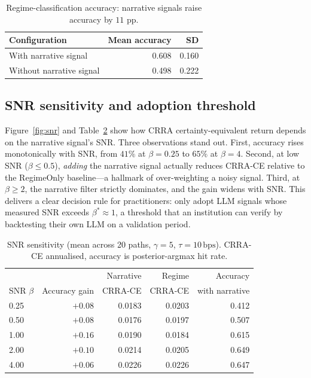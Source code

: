 \documentclass[review,12pt,authoryear]{elsarticle}
\begin{document}
\begin{table}[t]
\centering
\caption{Regime-classification accuracy: narrative signals raise accuracy by $11$ pp.}
\label{tab:acc}
\small
\begin{tabular}{lrr}
\toprule
Configuration & Mean accuracy & SD \\
\midrule
With narrative signal & 0.608 & 0.160 \\
Without narrative signal & 0.498 & 0.222 \\
\bottomrule
\end{tabular}
\end{table}

\subsection{SNR sensitivity and adoption threshold}
Figure~\ref{fig:snr} and Table~\ref{tab:snr} show how CRRA certainty-equivalent return
depends on the narrative signal's SNR. Three observations stand out. First, accuracy
rises monotonically with SNR, from $41\%$ at $\beta=0.25$ to $65\%$ at $\beta=4$. Second,
at low SNR ($\beta \le 0.5$), \emph{adding} the narrative signal actually reduces
CRRA-CE relative to the RegimeOnly baseline---a hallmark of over-weighting a noisy
signal. Third, at $\beta \ge 2$, the narrative filter strictly dominates, and the gain
widens with SNR. This delivers a clear decision rule for practitioners: only adopt LLM
signals whose measured SNR exceeds $\beta^{\ast} \approx 1$, a threshold that an
institution can verify by backtesting their own LLM on a validation period.

\begin{table}[t]
\centering
\caption{SNR sensitivity (mean across 20 paths, $\gamma=5$, $\tau=10\,\mathrm{bps}$).
CRRA-CE annualised, accuracy is posterior-argmax hit rate.}
\label{tab:snr}
\small
\begin{tabular}{lrrrr}
\toprule
 & & Narrative & Regime & Accuracy \\
SNR $\beta$ & Accuracy gain & CRRA-CE & CRRA-CE & with narrative \\
\midrule
0.25 & $+0.08$ & 0.0183 & 0.0203 & 0.412 \\
0.50 & $+0.08$ & 0.0176 & 0.0197 & 0.507 \\
1.00 & $+0.16$ & 0.0190 & 0.0184 & 0.615 \\
2.00 & $+0.10$ & 0.0214 & 0.0205 & 0.649 \\
4.00 & $+0.06$ & 0.0226 & 0.0226 & 0.647 \\
\bottomrule
\end{tabular}
\end{table}
\end{document}
